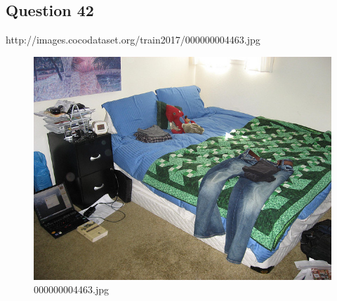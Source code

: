 \subsection*{Question 42}
http://images.cocodataset.org/train2017/000000004463.jpg
\begin{figure}[h]
    \centering
    \includegraphics[width=0.8\linewidth]{../image set/hard/000000004463.jpg}
    \caption{000000004463.jpg}
\end{figure}

